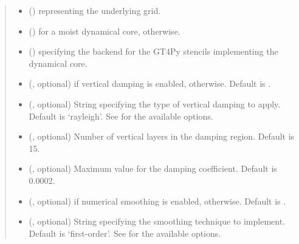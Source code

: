 \documentclass[letterpaper,10pt,english]{sphinxmanual}
\begin{document}
\begin{fulllineitems}
\begin{fulllineitems}
\begin{quote}
\begin{description}
\begin{itemize}
\item {} 
 () \textendash{} {\hyperref[\detokenize{api:tasmania.grids.grid_xyz.GridXYZ}]{}} representing the underlying grid.

\item {} 
 () \textendash{}  for a moist dynamical core,  otherwise.

\item {} 
 () \textendash{}  specifying the backend for the GT4Py stencils implementing the dynamical core.

\item {} 
 (, optional) \textendash{}  if vertical damping is enabled,  otherwise. Default is .

\item {} 
 (, optional) \textendash{} String specifying the type of vertical damping to apply. Default is ‘rayleigh’.
See {\hyperref[\detokenize{api:tasmania.dycore.vertical_damping.VerticalDamping}]{}} for the available options.

\item {} 
 (, optional) \textendash{} Number of vertical layers in the damping region. Default is 15.

\item {} 
 (, optional) \textendash{} Maximum value for the damping coefficient. Default is 0.0002.

\item {} 
 (, optional) \textendash{}  if numerical smoothing is enabled,  otherwise. Default is .

\item {} 
 (, optional) \textendash{} String specifying the smoothing technique to implement. Default is ‘first-order’.
See {\hyperref[\detokenize{api:tasmania.dycore.horizontal_smoothing.HorizontalSmoothing}]{}} for the available options.


\end{itemize}
\end{description}
\end{quote}
\end{fulllineitems}
\end{fulllineitems}
\end{document}
